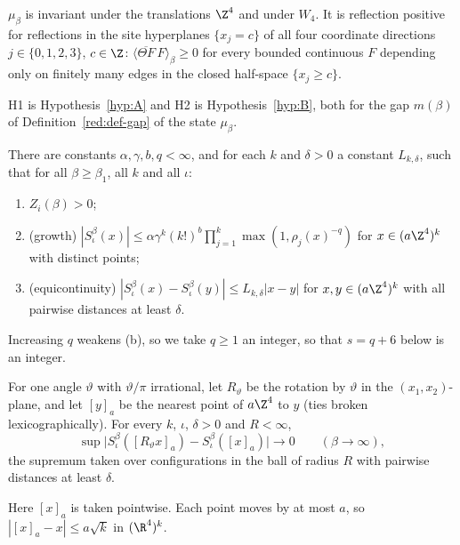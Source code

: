 \begin{hypothesis}\label{hyp:H0}
$\mu_\beta$ is invariant under the translations $\Z^4$ and under $W_4$. It is reflection positive for reflections in the site hyperplanes $\{x_j=c\}$ of all four coordinate directions $j\in\{0,1,2,3\}$, $c\in\Z$: $\langle\overline{\Theta F}\,F\rangle_\beta\ge0$ for every bounded continuous $F$ depending only on finitely many edges in the closed half-space $\{x_j\ge c\}$.
\end{hypothesis}

H1 is Hypothesis~\ref{hyp:A} and H2 is Hypothesis~\ref{hyp:B}, both for the gap $m(\beta)$ of Definition~\ref{red:def-gap} of the state $\mu_\beta$.

\begin{hypothesis}\label{hyp:H3}
There are constants $\alpha,\gamma,b,q<\infty$, and for each $k$ and $\delta>0$ a constant $L_{k,\delta}$, such that for all $\beta\ge\beta_1$, all $k$ and all $\iota$:
\begin{enumerate}
\item[(a)] $Z_i(\beta)>0$;
\item[(b)] (growth) $|S^\beta_\iota(x)|\le\alpha\gamma^k(k!)^b\prod_{j=1}^k\max(1,\rho_j(x)^{-q})$ for $x\in(a\Z^4)^k$ with distinct points;
\item[(c)] (equicontinuity) $|S^\beta_\iota(x)-S^\beta_\iota(y)|\le L_{k,\delta}|x-y|$ for $x,y\in(a\Z^4)^k$ with all pairwise distances at least $\delta$.
\end{enumerate}
\end{hypothesis}

Increasing $q$ weakens (b), so we take $q\ge1$ an integer, so that $s=q+6$ below is an integer.

\begin{hypothesis}\label{hyp:H4}
For one angle $\vartheta$ with $\vartheta/\pi$ irrational, let $R_\vartheta$ be the rotation by $\vartheta$ in the $(x_1,x_2)$-plane, and let $[y]_a$ be the nearest point of $a\Z^4$ to $y$ (ties broken lexicographically). For every $k$, $\iota$, $\delta>0$ and $R<\infty$,
\[
  \sup\bigl|S^\beta_\iota([R_\vartheta x]_a)-S^\beta_\iota([x]_a)\bigr|\to0\qquad(\beta\to\infty),
\]
the supremum taken over configurations in the ball of radius $R$ with pairwise distances at least $\delta$.
\end{hypothesis}

Here $[x]_a$ is taken pointwise. Each point moves by at most $a$, so $|[x]_a-x|\le a\sqrt k$ in $(\R^4)^k$.

